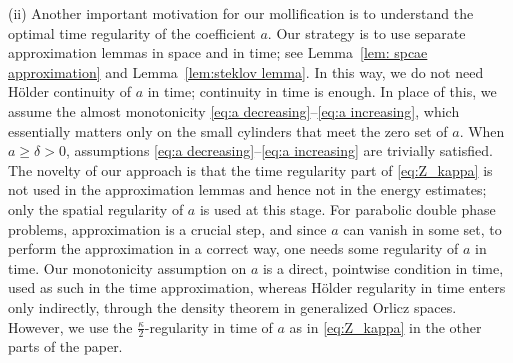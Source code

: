 \documentclass[notitlepage,11pt,reqno]{amsart}
\theoremstyle{definition}
\numberwithin{equation}{section}
\begin{document}
(ii) Another important motivation for our mollification is to understand the optimal time regularity of the coefficient $a$. Our strategy is to use separate approximation lemmas in space and in time; see Lemma~\ref{lem: spcae approximation} and Lemma~\ref{lem:steklov lemma}. In this way, we do not need H\"older continuity of $a$ in time; continuity in time is enough. In place of this, we assume the almost monotonicity \eqref{eq:a decreasing}--\eqref{eq:a increasing}, which essentially matters only on the small cylinders that meet the zero set of $a$. When $a \geq \delta > 0$, assumptions \eqref{eq:a decreasing}--\eqref{eq:a increasing} are trivially satisfied. The novelty of our approach is that the time regularity part of \eqref{eq:Z_kappa} is not used in the approximation lemmas and hence not in the energy estimates; only the spatial regularity of $a$ is used at this stage. For parabolic double phase problems, approximation is a crucial step, and since $a$ can vanish in some set, to perform the approximation in a correct way, one needs some regularity of $a$ in time. Our monotonicity assumption on $a$ is a direct, pointwise condition in time, used as such in the time approximation, whereas H\"older regularity in time enters only indirectly, through the density theorem in generalized Orlicz spaces. However, we use the $\frac{\kappa}{2}$-regularity in time of $a$ as in \eqref{eq:Z_kappa} in the other parts of the paper. 
\end{document}
